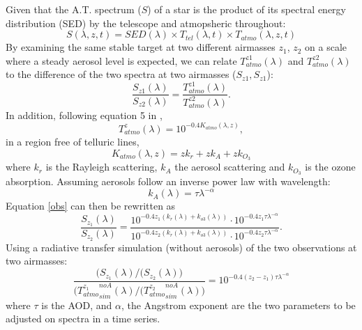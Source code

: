 \documentclass[DM,authoryear,toc,lsstdraft]{lsstdoc}
\begin{document}
Given that the A.T. spectrum ($S$) of a star is the product of its spectral energy distribution (SED) by the telescope and atmopsheric throughout:
\begin{equation}
  S(\lambda, z, t) = SED(\lambda) \times T_{tel}(\lambda, t) \times T_{atmo}(\lambda, z, t) 
\end{equation}
By examining the same stable target at two different airmasses $z_1$, $z_2$ on a scale where a steady aerosol level is expected, we can relate $T_{atmo}^{z1}(\lambda)$ and $T_{atmo}^{z2}(\lambda)$ to the difference of the two spectra at two airmasses ($S_{z1}, S_{z1}$):
\begin{equation}
  \frac{S_{z1}(\lambda)}{S_{z2}(\lambda)}  =\frac{T_{atmo}^{z1}(\lambda)}{T_{atmo}^{z2}(\lambda)}.
  \label{obs}
\end{equation}
In addition, following equation 5 in \cite{2013A&A...549A...8B},
\begin{equation}
T_{atmo}^{z}(\lambda) = 10^{-0.4 K_{atmo}(\lambda, z)},
\end{equation}
in a region free of telluric lines,
\begin{equation}
K_{atmo}(\lambda, z) = z k_r + z k_A + z k_{O_3}
\end{equation}
where $k_r$ is the Rayleigh scattering, $k_A$ the aerosol scattering and $k_{O_3}$ is the ozone absorption. Assuming aerosols follow an inverse power law with wavelength:
\begin{equation}
k_{A}(\lambda) = \tau \lambda^{-\alpha}
\end{equation}
Equation \ref{obs} can then be rewritten as
\begin{equation}
  \frac{S_{z_1}(\lambda)}{S_{z_2}(\lambda)}  =\frac{10^{-0.4 z_1 (k_r(\lambda) + k_{o3}(\lambda))} \cdot 10^{-0.4 z_1 \tau \lambda^{-\alpha}} }{10^{-0.4 z_2 (k_r(\lambda) + k_{o3}(\lambda))} \cdot 10^{-0.4 z_2 \tau \lambda^{-\alpha}}}.  
\end{equation}
Using a radiative transfer simulation (without aerosols) of the two observations at two airmasses:
\begin{equation}
  \frac{\Big(S_{z_1}(\lambda)/(S_{z_2}(\lambda)\Big)}{\Big({T_{atmo}^{z_1}}_{sim}^{noA}(\lambda)/({T_{atmo}^{z_2}}_{sim}^{noA}(\lambda)\Big)}  = 10^{-0.4 (z_2 - z_1)\tau \lambda^{-\alpha}}
\end{equation}
where $\tau$ is the AOD, and $\alpha$, the Angstrom exponent are the two parameters to be adjusted on spectra in a time series. 
\end{document}
